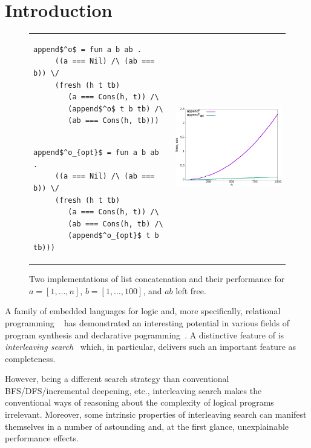 \section{Introduction}
\label{sec:intro}

\begin{figure}[t]
\begin{tabular}{p{6cm}p{6cm}}
\begin{lstlisting}[basicstyle=\small]
   append$^o$ = fun a b ab .
     ((a === Nil) /\ (ab === b)) \/
     (fresh (h t tb)
        (a === Cons(h, t)) /\
        (append$^o$ t b tb) /\
        (ab === Cons(h, tb)))
\end{lstlisting} & \multirow{2}{*}[-3mm]{\includegraphics[width=6cm,height=5cm]{append_without_oc.png}} \\[-9mm]
\begin{lstlisting}[basicstyle=\small]
   append$^o_{opt}$ = fun a b ab .
     ((a === Nil) /\ (ab === b)) \/
     (fresh (h t tb)
        (a === Cons(h, t)) /\
        (ab === Cons(h, tb) /\
        (append$^o_{opt}$ t b tb)))
\end{lstlisting} &
\end{tabular}
\caption{Two implementations of list concatenation and their performance for $a = [1,\dots,n]$, $b = [1,\dots,100]$, and $ab$ left free.}
\label{fig:length_implementations}
\end{figure}

A family of embedded languages for logic and, more specifically, relational programming \mK~\cite{TRS} has demonstrated an interesting potential in various fields of 
program synthesis and declarative pogramming~\cite{SevenProblems,Quines,Matching}. A distinctive feature of \mK is \emph{interleaving search}~\cite{Transformers} which,
in particular, delivers such an important feature as completeness.

However, being a different search strategy than conventional BFS/DFS/incremental deepening, etc., interleaving search makes the conventional ways of reasoning about the complexity
of logical programs irrelevant. Moreover, some intrinsic properties of interleaving search can manifest themselves in a number of astounding and, at the first glance, unexplainable
performance effects. 

